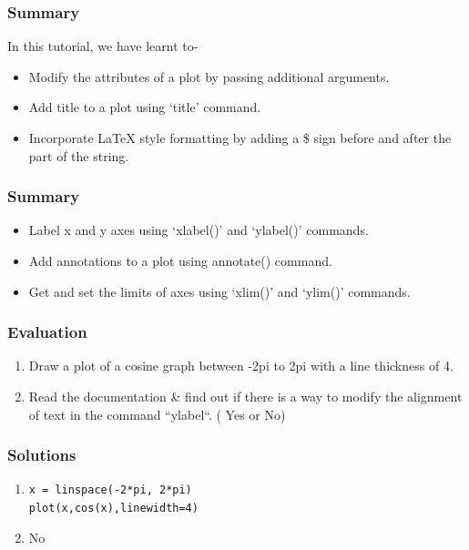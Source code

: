 \documentclass[17pt]{beamer}
\begin{document}
\begin{frame}
\frametitle{Summary}
\label{sec-11.1}
In this tutorial, we have learnt to-\pause
\begin{itemize}
\item Modify the attributes of a  plot by passing additional arguments.\pause
\item Add title to a plot using `title' command.\pause
\item Incorporate \LaTeX{} style formatting by adding a \$ sign before and after the part of the string.
\end{itemize}
\end{frame}
\begin{frame}
\frametitle{Summary}
\label{sec-11.2}
\begin{itemize}
\item Label x and y axes using `xlabel()' and `ylabel()' commands.\pause
\item Add annotations to a plot using annotate() command.\pause
\item Get and set the limits of axes using `xlim()' and `ylim()' commands.
\end{itemize}
\end{frame}
\begin{frame}
\frametitle{Evaluation}
\label{sec-12}
\begin{enumerate}
\item Draw a plot of a cosine graph between -2pi to 2pi with a line thickness of 4.\pause
\item Read the documentation \& find out if there is a way to modify the alignment of text in the command ``ylabel``. ( Yes or No)
\end{enumerate}
\end{frame}
\begin{frame}
\frametitle{Solutions}
\label{sec-13}
\begin{enumerate}
\item \texttt{x = linspace(-2*pi, 2*pi)}\\
		\texttt{plot(x,cos(x),linewidth=4)}
\item No

\end{enumerate}
\end{frame}
\end{document}
